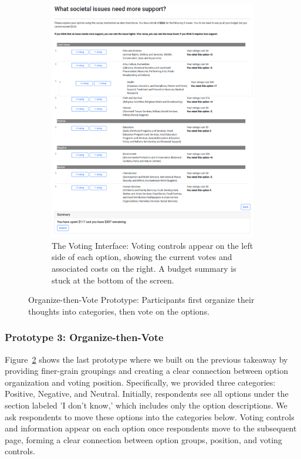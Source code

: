 \begin{figure}[h]
\begin{subfigure}[b]{0.48\textwidth}
        \includegraphics[width=\textwidth]{content/image/prototypes/4.2_grouping_vote.png}
        \caption{The Voting Interface: Voting controls appear on the left side of each option, showing the current votes and associated costs on the right. A budget summary is stuck at the bottom of the screen.}
        \label{fig:qv_org_p2}
    \end{subfigure}
    \caption{Organize-then-Vote Prototype: Participants first organize their thoughts into categories, then vote on the options.}
    \label{fig:qv_org}
\end{figure}

\subsubsection{Prototype 3: Organize-then-Vote}
Figure~\ref{fig:qv_org} shows the last prototype where we built on the previous takeaway by providing finer-grain groupings and creating a clear connection between option organization and voting position. Specifically, we provided three categories: Positive, Negative, and Neutral. Initially, respondents see all options under the section labeled 'I don't know,' which includes only the option descriptions. We ask respondents to move these options into the categories below. Voting controls and information appear on each option once respondents move to the subsequent page, forming a clear connection between option groups, position, and voting controls.

